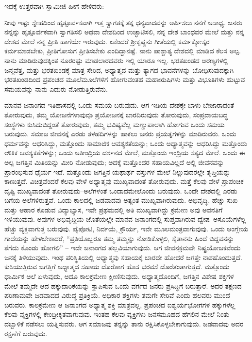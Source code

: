 ಇದಕ್ಕೆ ಉತ್ತರವಾಗಿ ಸ್ವಾಮೀಜಿ ಹೀಗೆ ಹೇಳಿದರು:

ನೀವು ಇಷ್ಟು ಸ್ನೇಹದಿಂದ ಹೃತ್ಪೂರ್ವಕವಾಗಿ ಇತ್ತ ಸ್ವಾಗತಕ್ಕೆ ತಕ್ಕ ಧನ್ಯವಾದವನ್ನು ಅರ್ಪಿಸಲು ನನಗೆ ಅಸಾಧ್ಯ. ಜನರು ನನ್ನನ್ನು ಹೃತ್ಪೂರ್ವಕವಾಗಿ ಸ್ವಾಗತಿಸಲಿ ಅಥವಾ ದೇಶದಿಂದ ಉಚ್ಛಾಟಿಸಲಿ, ನನ್ನ ದೇಶ ಬಾಂಧವರ ಮೇಲೆ ಮತ್ತು ನನ್ನ ದೇಶದ ಮೇಲೆ ನನ್ನ ಪ್ರೀತಿ ಹಾಗೆಯೇ ಇರುವುದು. ಏಕೆಂದರೆ ಶ‍್ರೀಕೃಷ್ಣನು ಗೀತೆಯಲ್ಲಿ ಕರ್ಮಕ್ಕೋಸ್ಕರ ಕರ್ಮಮಾಡಬೇಕು, ಪ್ರೀತಿಗೋಸುಗ ಪ್ರೀತಿಸಬೇಕು ಎಂದಿದ್ದಾನಷ್ಟೆ. ನಾನು ಪಾಶ್ಚಾತ್ಯ ದೇಶದಲ್ಲಿ ಮಾಡಿದ ಕೆಲಸ ಅಲ್ಪ. ನಾನು ಮಾಡಿರುವುದಕ್ಕಿಂತ ನೂರರಷ್ಟು ಮಾಡಲಾರದವರು ಇಲ್ಲಿ ಯಾರೂ ಇಲ್ಲ. ಭರತಖಂಡದ ಅರಣ್ಯಗಳಲ್ಲಿ ಜನ್ಮವೆತ್ತ, ಮತ್ತು ಭರತಖಂಡಕ್ಕೆ ಮಾತ್ರ ಸೇರಿದ, ಅಧ್ಯಾತ್ಮದ ಮತ್ತು ತ್ಯಾಗದ ಭಾವನೆಗಳನ್ನು ಬೋಧಿಸುವುದಕ್ಕಾಗಿ ಭರತಖಂಡದಿಂದ ಪ್ರಪಂಚದ ಮೂಲೆಮೂಲೆಗಳಿಗೆ ಹೋಗುವಂತಹ ಮಹಾಋಷಿಗಳು ಮತ್ತು ವಿಭೂತಿಗಳು ಹುಟ್ಟುವ ಸಮಯವನ್ನು ನಾನು ಎದುರು ನೋಡುತ್ತಿರುವೆನು.

ಮಾನವ ಜನಾಂಗದ ಇತಿಹಾಸದಲ್ಲಿ ಒಂದು ಸಮಯ ಬರುವುದು. ಆಗ ಇಡಿಯ ದೇಶಕ್ಕೇ ಬಾಳು ಬೇಜಾರಾದಂತೆ ತೋರುವುದು, ತಮ್ಮ ಯೋಜನೆಗಳಾವುವೂ ಪ್ರಯೋಜನಕ್ಕೆ ಬಾರದಿರುವುದು ತೋರುವುದು, ಸಂಪ್ರದಾಯಬದ್ಧ ಸಂಸ್ಥೆಗಳು ಕುಸಿದುಬಿದ್ದಂತೆ ತೋರುವುದು, ತಮ್ಮ ಭವಿಷ್ಯವೆಲ್ಲ ಮಣ್ಣುಪಾಲಾಗಿ ಹೋಗುವ ಒಂದು ಸಮಯ ಬರುವುದು. ಸಮಾಜ ಜೀವನಕ್ಕೆ ಎರಡು ತಳಹದಿಗಳನ್ನು ಹಾಕಲು ಜನರು ಪ್ರಯತ್ನಗಳನ್ನು ಮಾಡಿರುವರು. ಒಂದು ಧರ್ಮವನ್ನು ಆಧರಿಸಿದ್ದು, ಮತ್ತೊಂದು ಸಾಮಾಜಿಕ ಆವಶ್ಯಕತೆ\-ಯನ್ನು; ಒಂದು ಅಧ್ಯಾತ್ಮವನ್ನು ಆಧರಿಸಿದ್ದು ಮತ್ತೊಂದು ಲೌಕಿಕ ಆವಶ್ಯಕತೆಗಳನ್ನು; ಒಂದು ಅತೀಂದ್ರಿಯ ದರ್ಶನದ ಮೇಲೆ, ಮತ್ತೊಂದು ಇಂದ್ರಿಯ ಸತ್ಯದ ಮೇಲೆ. ಒಂದು ಈ ಅಲ್ಪ ಜಗತ್ತಿನ ಮಿತಿಯನ್ನು ಮೀರಿ ನೋಡುವುದು; ಅದಕ್ಕೆ ಮತ್ತೊಂದರ ಸಹಾಯವಿಲ್ಲದೆ ಅಲ್ಲಿ ಜೀವನವನ್ನು ಪ್ರಾರಂಭಿಸುವ ಧೈರ್ಯ ಇದೆ. ಮತ್ತೊಂದು ಜಗತ್ತಿನ ಯಥಾರ್ಥ ವಸ್ತುಗಳ ಮೇಲೆ ನಿಲ್ಲುವುದರಲ್ಲೇ ತೃಪ್ತಿಯನ್ನು ಕಾಣುತ್ತದೆ. ವಿಚಿತ್ರವೆಂದರೆ ಕೆಲವು ವೇಳೆ ಅಧ್ಯಾತ್ಮವು ಮುಖ್ಯವಾದಂತೆ ತೋರುವುದು. ಮತ್ತೆ ಕೆಲವು ವೇಳೆ ಪ್ರಾಪಂಚಿಕ ದೃಷ್ಟಿ ಮುಖ್ಯವಾದಂತೆ ತೋರುವುದು–ಅಲೆಗಳಂತೆ ಒಂದಾದಮೇಲೊಂದು ಬರುವುದು. ಒಂದೇ ದೇಶದಲ್ಲಿ ಎರಡು ಬಗೆಯ ಅಲೆಗಳಿರುತ್ತವೆ. ಒಂದು ಕಾಲದಲ್ಲಿ ಜಡವಾದವು ಅತ್ಯಂತ ಮುಖ್ಯವಾಗಿರುವುದು. ಅಭಿವೃದ್ಧಿ, ಹೆಚ್ಚು ಸುಖ ಮತ್ತು ಆಹಾರ ಕೊಡುವ ವಿದ್ಯಾಭ್ಯಾಸ, ಇವೇ ಪ್ರಥಮದಲ್ಲಿ ಅತಿ ಮುಖ್ಯವಾಗಿದ್ದು ಕ್ರಮೇಣ ಅವು ಅವನತಿಗೆ ಇಳಿಯುವುವು. ಅವುಗಳ ಅಭಿವೃದ್ಧಿಯ ಜೊತೆಯಲ್ಲೇ ಮಾನವ ಜನಾಂಗದಲ್ಲಿ ಸುಪ್ತವಾಗಿರುವ ದ್ವೇಷ–ಅಸೂಯೆಗಳೆಲ್ಲ ಹೆಚ್ಚು ವ್ಯಕ್ತವಾಗುತ್ತ ಬರುವುವು. ಪೈಪೋಟಿ, ನಿರ್ದಯೆ, ಕ್ರೌರ್ಯ, ಇವೇ ಮೂಲಮಂತ್ರವಾಗುವುವು. ಒಂದು ಆಂಗ್ಲೇಯ ಗಾದೆಯನ್ನು ಹೇಳಬೇಕಾದರೆ, “ಪ್ರತಿಯೊಬ್ಬರೂ ತಮ್ಮ ತಮ್ಮನ್ನು ನೋಡಿಕೊಳ್ಳಲಿ, ಸೈತಾನನು ಹಿಂದೆ ಬಿದ್ದವನನ್ನು ತೆಗೆದು\- ಕೊಂಡು ಹೋಗಲಿ” – ಇದೇ ಜನಾಂಗದ ಪಲ್ಲವಿಯಾಗುವುದು. ಆಗ ಜೀವನಕ್ರಮವೇ ನಿಷ್ಪ್ರಯೋಜಕವೆಂದು ಜನಕ್ಕೆ ತಿಳಿಯುವುದು. ಇಂಥ ಪರಿಸ್ಥಿತಿಯಲ್ಲಿ ಅಧ್ಯಾತ್ಮವು ಸಹಾಯಕ್ಕೆ ಬಾರದೇ ಹೋದರೆ ಜಗತ್ತೇ ನಾಶಹೊಂದುತ್ತದೆ. ಕುಸಿಯುತ್ತಿರುವ ಜಗತ್ತಿಗೆ ಅಧ್ಯಾತ್ಮದ ಸಹಾಯ ದೊರೆತಾಗ ಹೊಸ ಭರವಸೆ ದೊರೆತಂತಾಗುತ್ತದೆ. ಮತ್ತೊಂದು ಧಾರ್ಮಿಕ ಅಲೆ ಏಳುವುದು, ಅದೂ ಕಾಲಕ್ರಮೇಣ ಕ್ಷೀಣಿಸುವುದು. ಅಧ್ಯಾತ್ಮದೊಂದಿಗೆ, ಜಗತ್ತಿನ ವಿಶೇಷ ಶಕ್ತಿಗಳ ಮೇಲೆ ತಮ್ಮದೇ ಆದ ಹಕ್ಕುದಾರಿಕೆಯನ್ನು ಸ್ಥಾಪಿಸುವ ಒಂದು ವರ್ಗದ ಜನರು ಪ್ರಸಿದ್ಧಿಗೆ ಬರುತ್ತಾರೆ. ಅದರ ತಕ್ಷಣದ ಪರಿಣಾಮವೇ ಜಡವಾದದ ವಿರುದ್ಧ ಪ್ರತಿಕ್ರಿಯೆ. ಅಧಿಕಾರ ಶಕ್ತಿಗಳು ತಮಗೇ ಸೇರಿವೆ ಎಂದು ಹಲವರು ಮುಂದೆ ಬರುವರು. ಕಾಲಕ್ರಮೇಣ ಆ ಜನಾಂಗದ ಅಧ್ಯಾತ್ಮ ಶಕ್ತಿ ಮಾತ್ರವಲ್ಲ, ಪ್ರಪಂಚದ ಐಶ್ವರ್ಯಭೋಗಗಳ ಹಕ್ಕುಗಳೆಲ್ಲ ಕೆಲವು ವ್ಯಕ್ತಿಗಳಲ್ಲಿ ಕೇಂದ್ರೀಕೃತವಾಗುವುವು. ಇಂತಹ ಕೆಲವು ವ್ಯಕ್ತಿಗಳು ಜನಸಮೂಹದ ಹೆಗಲಿನ ಮೇಲೆ ನಿಂತು ದಬ್ಬಾಳಿಕೆ ನಡೆಸಲು ಯತ್ನಿಸುವರು. ಆಗ ಸಮಾಜವು ತನ್ನನ್ನು ತಾನು ರಕ್ಷಿಸಿಕೊಳ್ಳಬೇಕಾಗುವುದು. ಜಡವಾದವು ಅದರ ರಕ್ಷಣೆಗೆ ಬರುವುದು.

